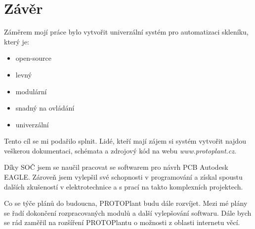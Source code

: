 \chapter*{Závěr}

Záměrem mojí práce bylo vytvořit univerzální systém pro automatizaci skleníku, který je:
\begin{itemize}
    \item open-source
    \item levný
    \item modulární
    \item snadný na ovládání
    \item univerzální
\end{itemize}

Tento cíl se mi podařilo splnit.
Lidé, kteří mají zájem si systém vytvořit najdou veškerou dokumentaci, schémata a zdrojový kód na webu \textit{www.protoplant.cz}.

Díky SOČ jsem se naučil pracovat se softwarem pro návrh PCB Autodesk EAGLE.
Zároveň jsem vylepšil své schopnosti v programování a získal spoustu dalších zkušeností v elektrotechnice a s prací na takto komplexních projektech.

Co se týče plánů do budoucna, PROTOPlant budu dále rozvíjet.
Mezi mé plány se řadí dokončení rozpracovaných modulů a další vylepšování softwaru.
Dále bych se rád zaměřil na rozšíření PROTOPlantu o možnosti z oblasti internetu věcí.

\newpage